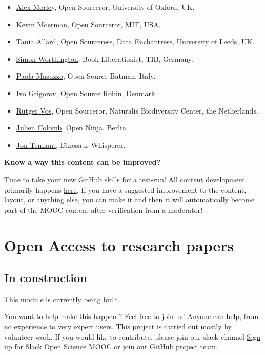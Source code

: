 \documentclass[]{book}
\providecommand{\tightlist}{%
  \setlength{\itemsep}{0pt}\setlength{\parskip}{0pt}}
\begin{document}
\begin{itemize}
\tightlist
\item
  \href{https://twitter.com/alex__morley}{Alex Morley}, Open Sourceror, University of Oxford, UK.
\item
  \href{https://twitter.com/KMMoerman}{Kevin Moerman}, Open Sourceror, MIT, USA.
\item
  \href{https://twitter.com/ixek}{Tania Allard}, Open Sourceress, Data Enchantress, University of Leeds, UK.
\item
  \href{https://twitter.com/mrchristian99}{Simon Worthington}, Book Liberationist, TIB, Germany.
\item
  \href{https://twitter.com/pcmasuzzo}{Paola Masuzzo}, Open Source Batman, Italy.
\item
  \href{https://twitter.com/OAforClimate}{Ivo Grigorov}, Open Source Robin, Denmark.
\item
  \href{https://twitter.com/rvosa}{Rutger Vos}, Open Sourceror, Naturalis Biodiversity Center, the Netherlands.
\item
  \href{https://twitter.com/j_colomb}{Julien Colomb}, Open Ninja, Berlin.
\item
  \href{https://twitter.com/protohedgehog}{Jon Tennant}, Dinosaur Whisperer.
\end{itemize}

\textbf{Know a way this content can be improved?}

Time to take your new GitHub skills for a test-run! All content development primarily happens \href{https://github.com/OpenScienceMOOC/Module-5-Open-Research-Software-and-Open-Source/blob/master/content_development/MAIN.md}{here}. If you have a suggested improvement to the content, layout, or anything else, you can make it and then it will automatically become part of the MOOC content after verification from a moderator!

\hypertarget{module6}{%
\chapter{Open Access to research papers}\label{module6}}

\hypertarget{in-construction-3}{%
\section{In construction}\label{in-construction-3}}

This module is currently being built.

You want to help make this happen ? Feel free to join us! Anyone can help, from no experience to very expert users. This project is carried out mostly by volunteer work. If you would like to contribute, please join our slack channel \href{https://osmooc.herokuapp.com/}{Sign up for Slack Open Science MOOC} or join our \href{https://open-science-mooc-invite.herokuapp.com/}{GitHub project team}.
\end{document}
